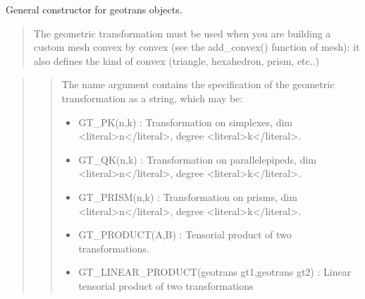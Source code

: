 \documentclass[a4paper,11pt,english]{sphinxmanual}
\begin{document}
\begin{sphinxVerbatim}[commandchars=\\\{\}]
   
\end{sphinxVerbatim}

\sphinxAtStartPar
{}

\sphinxAtStartPar
General constructor for geotrans objects.
\begin{quote}

\sphinxAtStartPar
The geometric transformation must be used when you are building a custom
mesh convex by convex (see the add\_convex() function of mesh): it also
defines the kind of convex (triangle, hexahedron, prism, etc..)
\end{quote}

\sphinxAtStartPar
{}
\begin{quote}

\sphinxAtStartPar
{}
\begin{quote}

\sphinxAtStartPar
The name argument contains the specification of the geometric transformation
as a string, which may be:
\begin{itemize}
\item {} 
\sphinxAtStartPar
GT\_PK(n,k) :
Transformation on simplexes, dim \textless{}literal\textgreater{}n\textless{}/literal\textgreater{}, degree \textless{}literal\textgreater{}k\textless{}/literal\textgreater{}.

\item {} 
\sphinxAtStartPar
GT\_QK(n,k) :
Transformation on parallelepipeds, dim \textless{}literal\textgreater{}n\textless{}/literal\textgreater{}, degree \textless{}literal\textgreater{}k\textless{}/literal\textgreater{}.

\item {} 
\sphinxAtStartPar
GT\_PRISM(n,k) :
Transformation on prisms, dim \textless{}literal\textgreater{}n\textless{}/literal\textgreater{}, degree \textless{}literal\textgreater{}k\textless{}/literal\textgreater{}.

\item {} 
\sphinxAtStartPar
GT\_PRODUCT(A,B) :
Tensorial product of two transformations.

\item {} 
\sphinxAtStartPar
GT\_LINEAR\_PRODUCT(geotrans gt1,geotrans gt2) :
Linear tensorial product of two transformations

\end{itemize}
\end{quote}
\end{quote}
\end{document}
